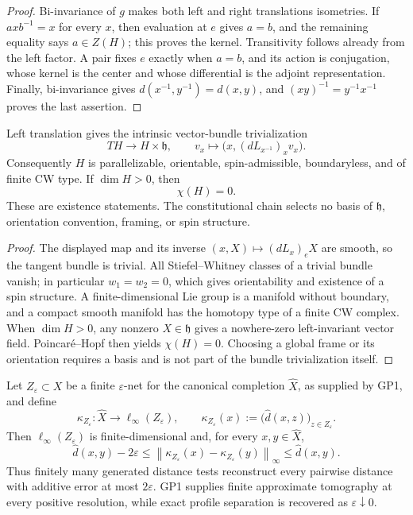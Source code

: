 \documentclass[11pt,a4paper]{article}
\begin{document}
\begin{proof}
Bi-invariance of \(g\) makes both left and right translations isometries.
If \(axb^{-1}=x\) for every \(x\), then evaluation at \(e\) gives \(a=b\),
and the remaining equality says \(a\in Z(H)\); this proves the kernel.
Transitivity follows already from the left factor.  A pair fixes \(e\)
exactly when \(a=b\), and its action is conjugation, whose kernel is the
center and whose differential is the adjoint representation.  Finally,
bi-invariance gives
\(d(x^{-1},y^{-1})=d(x,y)\), and
\((xy)^{-1}=y^{-1}x^{-1}\) proves the last assertion.
\end{proof}

\begin{theorem}
\label{p2:thm:parallelism-topology-closure}
Left translation gives the intrinsic vector-bundle trivialization
\[
 TH\longrightarrow H\times\mathfrak h,\qquad
 v_x\longmapsto
 \bigl(x,(dL_{x^{-1}})_xv_x\bigr).
\]
Consequently \(H\) is parallelizable, orientable, spin-admissible,
boundaryless, and of finite CW type.  If \(\dim H>0\), then
\[
 \chi(H)=0.
\]
These are existence statements.  The constitutional chain selects no basis of
\(\mathfrak h\), orientation convention, framing, or spin structure.
\end{theorem}

\begin{proof}
The displayed map and its inverse
\((x,X)\mapsto(dL_x)_eX\) are smooth, so the tangent bundle is trivial.
All Stiefel--Whitney classes of a trivial bundle vanish; in particular
\(w_1=w_2=0\), which gives orientability and existence of a spin structure.
A finite-dimensional Lie group is a manifold without boundary, and a compact
smooth manifold has the homotopy type of a finite CW complex.  When
\(\dim H>0\), any nonzero \(X\in\mathfrak h\) gives a nowhere-zero
left-invariant vector field.  Poincaré--Hopf then yields \(\chi(H)=0\).
Choosing a global frame or its orientation requires a basis and is not part
of the bundle trivialization itself.
\end{proof}

\begin{theorem}
\label{p2:thm:finite-resolution-profile-tomography}
Let \(Z_\varepsilon\subset X\) be a finite \(\varepsilon\)-net for the
canonical completion \(\widehat X\), as supplied by GP1, and define
\[
 \kappa_{Z_\varepsilon}:\widehat X\longrightarrow
 \ell_\infty(Z_\varepsilon),\qquad
 \kappa_{Z_\varepsilon}(x)
 :=\bigl(\widehat d(x,z)\bigr)_{z\in Z_\varepsilon}.
\]
Then \(\ell_\infty(Z_\varepsilon)\) is finite-dimensional and, for every
\(x,y\in\widehat X\),
\[
 \widehat d(x,y)-2\varepsilon
 \leq
 \left\|\kappa_{Z_\varepsilon}(x)
       -\kappa_{Z_\varepsilon}(y)\right\|_\infty
 \leq \widehat d(x,y).
\]
Thus finitely many generated distance tests reconstruct every pairwise
distance with additive error at most \(2\varepsilon\).  GP1 supplies finite
approximate tomography at every positive resolution, while exact profile
separation is recovered as \(\varepsilon\downarrow0\).
\end{theorem}
\end{document}
